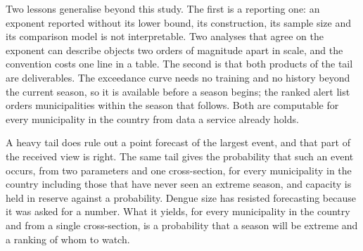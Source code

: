 \documentclass[english,10pt,b5paper]{article}
\begin{document}
Two lessons generalise beyond this study. The first is a reporting one: an
exponent reported without its lower bound, its construction, its sample size
and its comparison model is not interpretable. Two analyses that agree on the
exponent can describe objects two orders of magnitude apart in scale, and the
convention costs one line in a table. The second is that both products of the
tail are deliverables. The exceedance curve needs no training and no history
beyond the current season, so it is available before a season begins; the
ranked alert list orders municipalities within the season that follows. Both
are computable for every municipality in the country from data a service
already holds.

A heavy tail does rule out a point forecast of the largest event, and that part of
the received view is right. The same tail gives the probability that such an event
occurs, from two parameters and one cross-section, for every municipality in the
country including those that have never seen an extreme season, and capacity is
held in reserve against a probability. Dengue size has resisted forecasting
because it was asked for a number. What it yields, for every municipality in the
country and from a single cross-section, is a probability that a season will be
extreme and a ranking of whom to watch.



\end{document}
